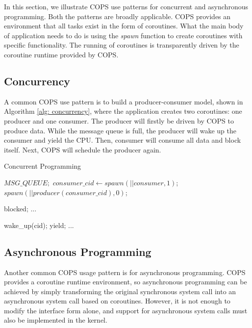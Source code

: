\documentclass[sigconf,review,anonymous]{acmart}
\begin{document}
In this section, we illustrate COPS use patterns for concurrent and asynchronous programming. Both the patterns are broadly applicable. COPS provides an environment that all tasks exist in the form of coroutines. What the main body of application needs to do is using the \textit{spawn} function to create coroutines with specific functionality. The running of coroutines is transparently driven by the coroutine runtime provided by COPS.

\subsection{Concurrency}

A common COPS use pattern is to build a producer-consumer model, shown in Algorithm \ref{alg: concurrency}, where the application creates two coroutines: one producer and one consumer. The producer will firstly be driven by COPS to produce data. While the message queue is full, the producer will wake up the consumer and yield the CPU. Then, consumer will consume all data and block itself. Next, COPS will schedule the producer again.

\begin{algorithm}[!h]
  \caption{Concurrent Programming}
  \label{alg: concurrency}
  \begin{algorithmic}[1]
    \State $MSG\_QUEUE;$
      \State $consumer\_cid \gets spawn(|| consumer, 1)$;
      \State $spawn(|| producer(consumer\_cid), 0)$;
		\EndFunction

      \Loop
          \State blocked;
        \EndWhile
        \State ... 
      \EndLoop
    \EndFunction

      \Loop
          \State wake\_up(cid); 
          \State yield;
        \EndWhile
        \State ... 
      \EndLoop
    \EndFunction
  \end{algorithmic}
\end{algorithm}

\subsection{Asynchronous Programming}

Another common COPS usage pattern is for asynchronous programming. COPS provides a coroutine runtime environment, so asynchronous programming can be achieved by simply transforming the original synchronous system call into an asynchronous system call based on coroutines. However, it is not enough to modify the interface form alone, and support for asynchronous system calls must also be implemented in the kernel.
\end{document}
